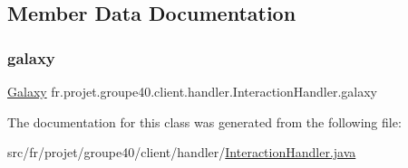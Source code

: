 \subsection{Member Data Documentation}
\mbox{\label{classfr_1_1projet_1_1groupe40_1_1client_1_1handler_1_1_interaction_handler_a9cd8c67ac423a8a189cab902b148d934}} 
\subsubsection{\texorpdfstring{galaxy}{galaxy}}
{\footnotesize\ttfamily \hyperlink{classfr_1_1projet_1_1groupe40_1_1model_1_1board_1_1_galaxy}{Galaxy} fr.\+projet.\+groupe40.\+client.\+handler.\+Interaction\+Handler.\+galaxy\hspace{0.3cm}{\ttfamily [protected]}}



The documentation for this class was generated from the following file\+:\begin{DoxyCompactItemize}
\item 
src/fr/projet/groupe40/client/handler/\hyperlink{_interaction_handler_8java}{Interaction\+Handler.\+java}\end{DoxyCompactItemize}
